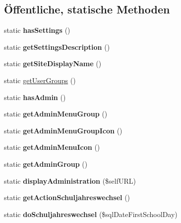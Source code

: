 \subsection*{Öffentliche, statische Methoden}
\begin{DoxyCompactItemize}
\item 
\mbox{\label{classlehrerkalender_aa0e61418c6a91fa7711774b73fddd890}} 
static {\bfseries has\+Settings} ()
\item 
\mbox{\label{classlehrerkalender_ab0adcb0290ea6e28351d9f4ef61d380b}} 
static {\bfseries get\+Settings\+Description} ()
\item 
\mbox{\label{classlehrerkalender_a8db741f6acd9d82f1d066ad4ff928d4f}} 
static {\bfseries get\+Site\+Display\+Name} ()
\item 
static \mbox{\hyperlink{classlehrerkalender_ac26ab312a449a43cec8f42e2a23c6f90}{get\+User\+Groups}} ()
\item 
\mbox{\label{classlehrerkalender_ac55c75371dff7d50a96e9fad70c0154c}} 
static {\bfseries has\+Admin} ()
\item 
\mbox{\label{classlehrerkalender_a546dac0c3ffa75a41f2571fa90436afd}} 
static {\bfseries get\+Admin\+Menu\+Group} ()
\item 
\mbox{\label{classlehrerkalender_a750b926b7332f408ec9fccd6d7bf3eba}} 
static {\bfseries get\+Admin\+Menu\+Group\+Icon} ()
\item 
\mbox{\label{classlehrerkalender_a9de4f9940042efd121f25cbbe3806c35}} 
static {\bfseries get\+Admin\+Menu\+Icon} ()
\item 
\mbox{\label{classlehrerkalender_a814124d30e858a4aac26b48f8446db0f}} 
static {\bfseries get\+Admin\+Group} ()
\item 
\mbox{\label{classlehrerkalender_a47085d4f19a867335e639f97adeecab0}} 
static {\bfseries display\+Administration} (\$self\+U\+RL)
\item 
\mbox{\label{classlehrerkalender_adbf68addc417746acc171af1fee2879d}} 
static {\bfseries get\+Action\+Schuljahreswechsel} ()
\item 
\mbox{\label{classlehrerkalender_a08fdbcebcb697efbbbef4be92b411a59}} 
static {\bfseries do\+Schuljahreswechsel} (\$sql\+Date\+First\+School\+Day)
\end{DoxyCompactItemize}
